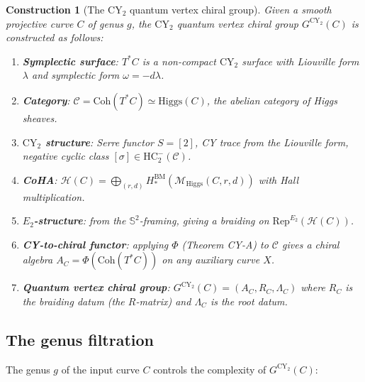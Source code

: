 \documentclass[11pt]{article}
\theoremstyle{garamondthm}
\theoremstyle{garamonddef}
\newtheorem{construction}[theorem]{Construction}
\theoremstyle{garamondrem}
\newcommand{\Rep}{\mathrm{Rep}}
\newcommand{\Coh}{\mathrm{Coh}}
\newcommand{\CY}{\mathrm{CY}}
\newcommand{\HC}{\mathrm{HC}}
\newcommand{\Etwo}{E_2}
\newcommand{\cC}{\mathcal{C}}
\newcommand{\cH}{\mathcal{H}}
\newcommand{\cM}{\mathcal{M}}
\newcommand{\Higgs}{\mathrm{Higgs}}
\begin{document}
\begin{construction}[The $\CY_2$ quantum vertex chiral group]
\label{constr:cy2-qvcg}
Given a smooth projective curve $C$ of genus $g$, the $\CY_2$ quantum vertex chiral group $G^{\CY_2}(C)$ is constructed as follows:
\begin{enumerate}[label=\textbf{Step \arabic*.}]
 \item \textbf{Symplectic surface}: $T^*C$ is a non-compact $\CY_2$ surface with Liouville form $\lambda$ and symplectic form $\omega = -d\lambda$.
 \item \textbf{Category}: $\cC = \Coh(T^*C) \simeq \Higgs(C)$, the abelian category of Higgs sheaves.
 \item \textbf{$\CY_2$ structure}: Serre functor $S = [2]$, CY trace from the Liouville form, negative cyclic class $[\sigma] \in \HC^-_2(\cC)$.
 \item \textbf{CoHA}: $\cH(C) = \bigoplus_{(r,d)} H^{\mathrm{BM}}_*(\cM_{\Higgs}(C,r,d))$ with Hall multiplication.
 \item \textbf{$\Etwo$-structure}: from the $\mathbb{S}^2$-framing, giving a braiding on $\Rep^{\Etwo}(\cH(C))$.
 \item \textbf{CY-to-chiral functor}: applying $\Phi$ (Theorem CY-A) to $\cC$ gives a chiral algebra $A_C = \Phi(\Coh(T^*C))$ on any auxiliary curve $X$.
 \item \textbf{Quantum vertex chiral group}: $G^{\CY_2}(C) = (A_C, R_C, \Lambda_C)$ where $R_C$ is the braiding datum (the $R$-matrix) and $\Lambda_C$ is the root datum.
\end{enumerate}
\end{construction}

\subsection{The genus filtration}
\label{ssec:genus-filtration}

The genus $g$ of the input curve $C$ controls the complexity of $G^{\CY_2}(C)$:
\end{document}
